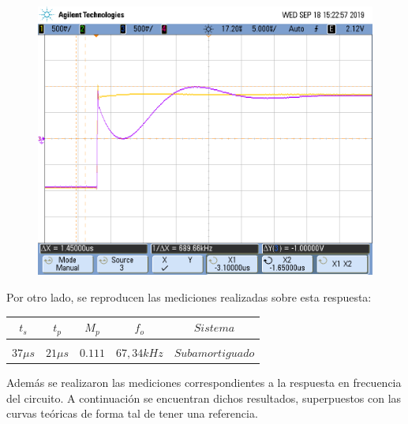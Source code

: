 \begin{figure}[H]
	\centering
	\includegraphics[scale=0.3]{../Mediciones/Osciloscopio/Rechazabanda_respuesta_escalon/scope_5.png}
\end{figure}

Por otro lado, se reproducen las mediciones realizadas sobre esta respuesta:

\begin{table}[H]
    \centering
    \begin{tabular}{c c c c c}
        $t_s$ & $t_p$ & $M_p$ & $f_o$ & $Sistema$ \\
        \hline \\
        $37 \mu s$ & $21 \mu s$ & $0.111$ & $67,34kHz$ & $Subamortiguado$ \\
        \hline
    \end{tabular}
    \label{tab:natural_rechazabanda}
\end{table}



Adem\'as se realizaron las mediciones correspondientes a la respuesta en frecuencia del circuito. A continuaci\'on se encuentran dichos resultados, superpuestos con las curvas te\'oricas de forma tal de tener una referencia.

